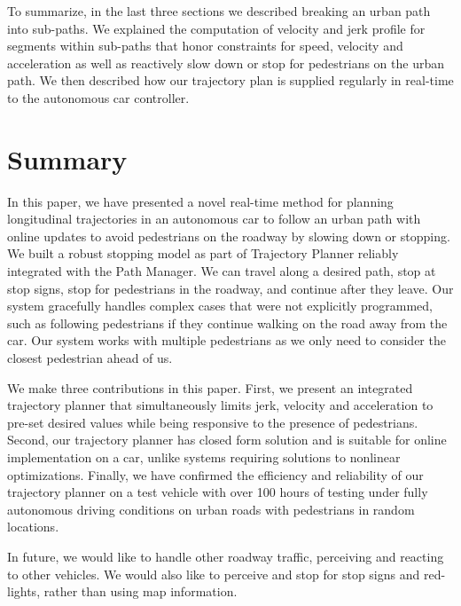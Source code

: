 \documentclass[letterpaper, 10 pt, conference]{ieeeconf}  %
\begin{document}
To summarize, in the last three sections we described breaking an urban path into sub-paths. We 
explained the computation of velocity and jerk profile for segments within sub-paths that honor constraints
for speed, velocity and acceleration as well as reactively slow down or stop for pedestrians on
the urban path. We then described how our trajectory plan is supplied regularly in real-time to the
autonomous car controller.

\section{Summary} \label{sec:summary}


In this paper, we have presented a novel real-time method for planning longitudinal trajectories 
in an autonomous car to follow an urban path with online updates to avoid pedestrians on the roadway by slowing down or 
stopping.
We built a robust stopping model as part of Trajectory Planner reliably integrated with the Path Manager.
We can travel along a desired path, stop at stop signs, stop for pedestrians in the roadway, and continue after 
they leave. Our system gracefully handles complex cases that were not explicitly programmed, such as following 
pedestrians if they continue walking on the road away from the car. Our system works with multiple 
pedestrians as we only need to consider the closest pedestrian ahead of us. 

We make three contributions in this paper. First, we present an integrated trajectory planner that
simultaneously limits jerk, velocity and acceleration to pre-set desired values while being responsive 
to the presence of pedestrians.
Second, our trajectory planner has closed form solution and is suitable for online implementation
on a car, unlike systems requiring solutions to nonlinear optimizations. Finally, we have confirmed the
efficiency and reliability of our trajectory planner on a test vehicle with over 100 hours of testing
under fully autonomous driving conditions on urban roads with pedestrians in random locations. 

In future, we would like to handle other roadway traffic, perceiving and reacting to other vehicles. We would also like to perceive and stop for stop signs and red-lights,
rather than using map information.





\end{document}
